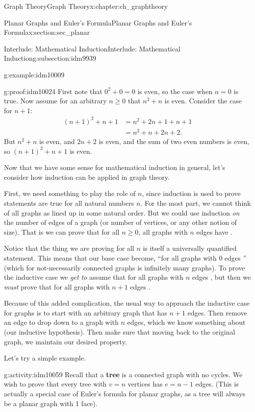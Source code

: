 \documentclass[oneside,10pt,]{book}
\newcommand{\terminology}[1]{\textbf{#1}}
\numberwithin{equation}{chapter}
\newcommand{\amp}{&}
\begin{document}
\begin{chapterptx}{Graph Theory}{}{Graph Theory}{}{}{x:chapter:ch_graphtheory}
\begin{sectionptx}{Planar Graphs and Euler's Formula}{}{Planar Graphs and Euler's Formula}{}{}{x:section:sec_planar}
\begin{subsectionptx}{Interlude: Mathematical Induction}{}{Interlude: Mathematical Induction}{}{}{g:subsection:idm9939}
\begin{example}{}{g:example:idm10009}
\begin{proofptx}{}{g:proof:idm10024}
First note that \(0^2 + 0 = 0\) is even, so the case when \(n = 0\) is true.  Now assume for an arbitrary \(n\ge 0\) that \(n^2 + n\) is even.  Consider the case for \(n+1\):%
\begin{align*}
(n+1)^2 + n+1 \amp = n^2 + 2n + 1 + n + 1\\
\amp = n^2 + n + 2n + 2.
\end{align*}
But \(n^2 + n\) is even, and \(2n + 2\) is even, and the sum of two even numbers is even, so \((n+1)^2 + n+1\) is even.%
\end{proofptx}
\end{example}
Now that we have some sense for mathematical induction in general, let's consider how induction can be applied in graph theory.%
\par
First, we need something to play the role of \(n\), since induction is used to prove statements are true for all natural numbers \(n\).  For the most part, we cannot think of all graphs as lined up in some natural order.  But we could use induction \emph{on} the number of edges of a graph (or number of vertices, or any other notion of size).  That is we can prove that for all \(n\ge 0\), all graphs with \(n\) edges have \textellipsis{}.%
\par
Notice that the thing we are proving for all \(n\) is itself a universally quantified statement. This means that our base case become, ``for all graphs with 0 edges \textellipsis{}'' (which for not-necessarily connected graphs is infinitely many graphs).  To prove the inductive case we \emph{get to} assume that for all graphs with \(n\) edges \textellipsis{}, but then we \emph{must} prove that for all graphs with \(n+1\) edges \textellipsis{}.%
\par
Because of this added complication, the usual way to approach the inductive case for graphs is to start with an arbitrary graph that has \(n+1\) edges.  Then remove an edge to drop down to a graph with \(n\) edges, which we know something about (our inductive hypothesis).  Then make sure that moving back to the original graph, we maintain our desired property.%
\par
Let's try a simple example.%
\begin{activity}{}{g:activity:idm10059}%
Recall that a \terminology{tree} is a connected graph with no cycles.  We wish to prove that every tree with \(v = n\) vertices has \(e = n-1\) edges.  (This is actually a special case of Euler's formula for planar graphs, as a tree will always be a planar graph with 1 face).%

\end{activity}
\end{subsectionptx}
\end{sectionptx}
\end{chapterptx}
\end{document}
